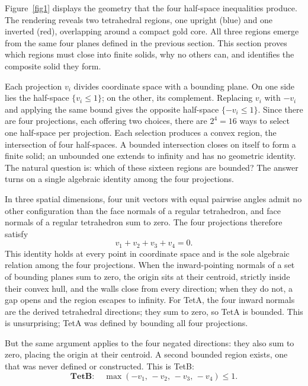 \documentclass[twocolumn]{iopjournal}
\begin{document}
Figure~\ref{fig1} displays the geometry that the four half-space
inequalities produce. The rendering reveals two tetrahedral regions, one
upright (blue) and one inverted (red), overlapping around a compact gold
core. All three regions emerge from the same four planes defined in the
previous section. This section proves which regions must close into finite
solids, why no others can, and identifies the composite solid they form.

Each projection $v_i$ divides coordinate space with a bounding plane. On
one side lies the half-space $\{v_i \leq 1\}$; on the other, its
complement. Replacing $v_i$ with $-v_i$ and applying the same bound gives
the opposite half-space $\{-v_i \leq 1\}$. Since there are four
projections, each offering two choices, there are $2^4 = 16$ ways to
select one half-space per projection. Each selection produces a convex
region, the intersection of four half-spaces. A bounded intersection
closes on itself to form a finite solid; an unbounded one extends to
infinity and has no geometric identity. The natural question is: which of
these sixteen regions are bounded? The answer turns on a single algebraic
identity among the four projections.

In three spatial dimensions, four unit vectors with equal pairwise angles
admit no other configuration than the face normals of a regular
tetrahedron, and face normals of a regular tetrahedron sum to zero. The
four projections therefore satisfy
\begin{equation}
v_1 + v_2 + v_3 + v_4 = 0.
\end{equation}
This identity holds at every point in coordinate space and is the sole
algebraic relation among the four projections. When the inward-pointing
normals of a set of bounding planes sum to zero, the origin sits at their
centroid, strictly inside their convex hull, and the walls close from
every direction; when they do not, a gap opens and the region escapes to
infinity. For TetA, the four inward normals are the derived tetrahedral
directions; they sum to zero, so TetA is bounded. This is unsurprising;
TetA was defined by bounding all four projections.

But the same argument applies to the four negated directions: they also sum to
zero, placing the origin at their centroid. A second bounded region
exists, one that was never defined or constructed. This is TetB:
\begin{equation}
\textbf{TetB}: \quad \max(-v_1,\, -v_2,\, -v_3,\, -v_4) \leq 1.
\end{equation}
\end{document}

